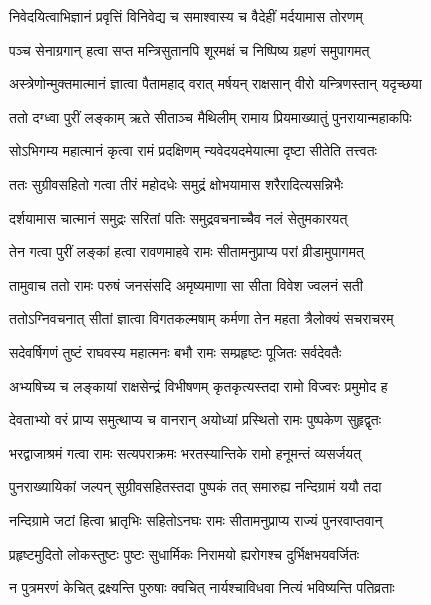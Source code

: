 \twolineshloka
{निवेदयित्वाभिज्ञानं प्रवृत्तिं विनिवेद्य च}
{समाश्वास्य च वैदेहीं मर्दयामास तोरणम्} %

\twolineshloka
{पञ्च सेनाग्रगान् हत्वा सप्त मन्त्रिसुतानपि}
{शूरमक्षं च निष्पिष्य ग्रहणं समुपागमत्} %

\twolineshloka
{अस्त्रेणोन्मुक्तमात्मानं ज्ञात्वा पैतामहाद् वरात्}
{मर्षयन् राक्षसान् वीरो यन्त्रिणस्तान् यदृच्छया} %

\twolineshloka
{ततो दग्ध्वा पुरीं लङ्काम् ऋते सीताञ्च मैथिलीम्}
{रामाय प्रियमाख्यातुं पुनरायान्महाकपिः} %

\twolineshloka
{सोऽभिगम्य महात्मानं कृत्वा रामं प्रदक्षिणम्}
{न्यवेदयदमेयात्मा दृष्टा सीतेति तत्त्वतः} %

\twolineshloka
{ततः सुग्रीवसहितो गत्वा तीरं महोदधेः}
{समुद्रं क्षोभयामास शरैरादित्यसन्निभैः} %

\twolineshloka
{दर्शयामास चात्मानं समुद्रः सरितां पतिः}
{समुद्रवचनाच्चैव नलं सेतुमकारयत्} %

\twolineshloka
{तेन गत्वा पुरीं लङ्कां हत्वा रावणमाहवे}
{रामः सीतामनुप्राप्य परां व्रीडामुपागमत्} %

\twolineshloka
{तामुवाच ततो रामः परुषं जनसंसदि}
{अमृष्यमाणा सा सीता विवेश ज्वलनं सती} %

\twolineshloka
{ततोऽग्निवचनात् सीतां ज्ञात्वा विगतकल्मषाम्}
{कर्मणा तेन महता त्रैलोक्यं सचराचरम्} %

\twolineshloka
{सदेवर्षिगणं तुष्टं राघवस्य महात्मनः}
{बभौ रामः सम्प्रहृष्टः पूजितः सर्वदेवतैः} %

\twolineshloka
{अभ्यषिच्य च लङ्कायां राक्षसेन्द्रं विभीषणम्}
{कृतकृत्यस्तदा रामो विज्वरः प्रमुमोद ह} %

\twolineshloka
{देवताभ्यो वरं प्राप्य समुत्थाप्य च वानरान्}
{अयोध्यां प्रस्थितो रामः पुष्पकेण सुहृद्वृतः} %

\twolineshloka
{भरद्वाजाश्रमं गत्वा रामः सत्यपराक्रमः}
{भरतस्यान्तिके रामो हनूमन्तं व्यसर्जयत्} %

\twolineshloka
{पुनराख्यायिकां जल्पन् सुग्रीवसहितस्तदा}
{पुष्पकं तत् समारुह्य नन्दिग्रामं ययौ तदा} %

\twolineshloka
{नन्दिग्रामे जटां हित्वा भ्रातृभिः सहितोऽनघः}
{रामः सीतामनुप्राप्य राज्यं पुनरवाप्तवान्} %

\twolineshloka
{प्रहृष्टमुदितो लोकस्तुष्टः पुष्टः सुधार्मिकः}
{निरामयो ह्यरोगश्च दुर्भिक्षभयवर्जितः} %

\twolineshloka
{न पुत्रमरणं केचित् द्रक्ष्यन्ति पुरुषाः क्वचित्}
{नार्यश्चाविधवा नित्यं भविष्यन्ति पतिव्रताः} %

